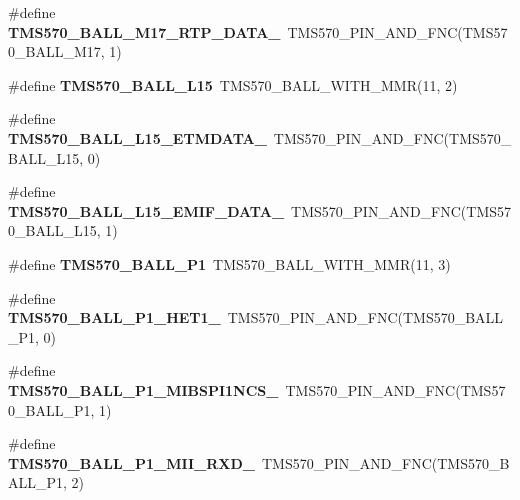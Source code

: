 \begin{DoxyCompactItemize}
\#define {\bfseries T\+M\+S570\+\_\+\+B\+A\+L\+L\+\_\+\+M17\+\_\+\+R\+T\+P\+\_\+\+D\+A\+T\+A\+\_}~T\+M\+S570\+\_\+\+P\+I\+N\+\_\+\+A\+N\+D\+\_\+\+F\+NC(T\+M\+S570\+\_\+\+B\+A\+L\+L\+\_\+\+M17, 1)
\item 
\mbox{\label{tms570ls3137zwt-pins_8h_a1db68205f6e199d164d67c6847e1fc36}} 
\#define {\bfseries T\+M\+S570\+\_\+\+B\+A\+L\+L\+\_\+\+L15}~T\+M\+S570\+\_\+\+B\+A\+L\+L\+\_\+\+W\+I\+T\+H\+\_\+\+M\+MR(11, 2)
\item 
\mbox{\label{tms570ls3137zwt-pins_8h_ad6840fd16bf18f681fe82a1b625f6f8f}} 
\#define {\bfseries T\+M\+S570\+\_\+\+B\+A\+L\+L\+\_\+\+L15\+\_\+\+E\+T\+M\+D\+A\+T\+A\+\_}~T\+M\+S570\+\_\+\+P\+I\+N\+\_\+\+A\+N\+D\+\_\+\+F\+NC(T\+M\+S570\+\_\+\+B\+A\+L\+L\+\_\+\+L15, 0)
\item 
\mbox{\label{tms570ls3137zwt-pins_8h_a4947675dcbf87e99596ccbc94564f875}} 
\#define {\bfseries T\+M\+S570\+\_\+\+B\+A\+L\+L\+\_\+\+L15\+\_\+\+E\+M\+I\+F\+\_\+\+D\+A\+T\+A\+\_}~T\+M\+S570\+\_\+\+P\+I\+N\+\_\+\+A\+N\+D\+\_\+\+F\+NC(T\+M\+S570\+\_\+\+B\+A\+L\+L\+\_\+\+L15, 1)
\item 
\mbox{\label{tms570ls3137zwt-pins_8h_a005b2383f67e08e17657931e7163e116}} 
\#define {\bfseries T\+M\+S570\+\_\+\+B\+A\+L\+L\+\_\+\+P1}~T\+M\+S570\+\_\+\+B\+A\+L\+L\+\_\+\+W\+I\+T\+H\+\_\+\+M\+MR(11, 3)
\item 
\mbox{\label{tms570ls3137zwt-pins_8h_a00dd1ebdb23c58563401a02af2a74598}} 
\#define {\bfseries T\+M\+S570\+\_\+\+B\+A\+L\+L\+\_\+\+P1\+\_\+\+H\+E\+T1\+\_}~T\+M\+S570\+\_\+\+P\+I\+N\+\_\+\+A\+N\+D\+\_\+\+F\+NC(T\+M\+S570\+\_\+\+B\+A\+L\+L\+\_\+\+P1, 0)
\item 
\mbox{\label{tms570ls3137zwt-pins_8h_ada962d594c23506413f6e93beb372680}} 
\#define {\bfseries T\+M\+S570\+\_\+\+B\+A\+L\+L\+\_\+\+P1\+\_\+\+M\+I\+B\+S\+P\+I1\+N\+C\+S\+\_}~T\+M\+S570\+\_\+\+P\+I\+N\+\_\+\+A\+N\+D\+\_\+\+F\+NC(T\+M\+S570\+\_\+\+B\+A\+L\+L\+\_\+\+P1, 1)
\item 
\mbox{\label{tms570ls3137zwt-pins_8h_a766d4977187f59c0edd63fb2d5ce7822}} 
\#define {\bfseries T\+M\+S570\+\_\+\+B\+A\+L\+L\+\_\+\+P1\+\_\+\+M\+I\+I\+\_\+\+R\+X\+D\+\_}~T\+M\+S570\+\_\+\+P\+I\+N\+\_\+\+A\+N\+D\+\_\+\+F\+NC(T\+M\+S570\+\_\+\+B\+A\+L\+L\+\_\+\+P1, 2)

\end{DoxyCompactItemize}
